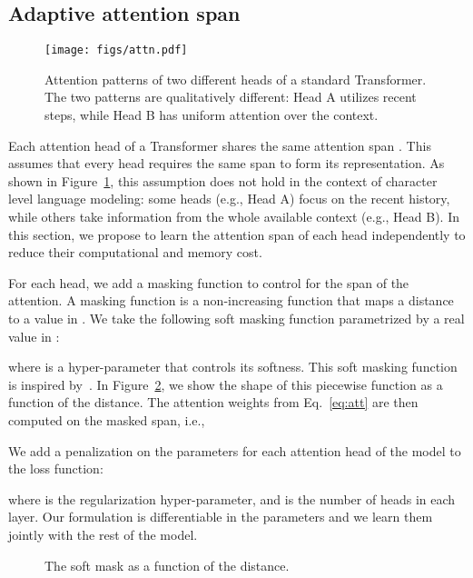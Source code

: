 \documentclass[11pt,a4paper]{article}
\newcommand{\fig}[1]{Figure~\ref{fig:#1}}
\newcommand{\eq}[1]{Eq.~\ref{eq:#1}}
\begin{document}
\subsection{Adaptive attention span}
\label{sec:learned}

\begin{figure}[t]
\centering
\texttt{[image: figs/attn.pdf]}
\caption{Attention patterns of two different heads of a standard Transformer. The two patterns are qualitatively different: Head A utilizes recent steps, while Head B has uniform attention over the context.}
\label{fig:vanilla}
\end{figure}

Each attention head of a Transformer shares the same attention span .
This assumes that every head requires the same span to form its representation.
As shown in Figure~\ref{fig:vanilla}, this assumption does not hold in the context of character level language modeling:
some heads (e.g., Head A) focus on the recent history, while others take information from the whole available context (e.g., Head B).
In this section, we propose to learn the attention span of each head independently to reduce their computational and memory cost.

For each head, we add a masking function to control for the span of the attention.
A masking function is a non-increasing function that maps a distance to a value in .
We take the following soft masking function  parametrized by a real value  in :

where  is a hyper-parameter that controls its softness.
This soft masking function is inspired by~\citet{jernite2016variable}.
In \fig{ramp}, we show the shape of this piecewise function as a function of the distance.
The attention weights from \eq{att} are then computed on the masked span, i.e.,

We add  a  penalization on the parameters  for each attention head  of the model to the loss function:

where  is the regularization hyper-parameter, and  is the number of heads in each layer.
Our formulation is differentiable in the parameters  and we learn them jointly with the rest of the model.

\begin{figure}[t]
\centering
  \caption{The soft mask as a function of the distance.}
  \label{fig:ramp}
\end{figure}
\end{document}
